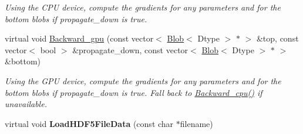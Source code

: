 \begin{DoxyCompactItemize}
\begin{DoxyCompactList}\small\item\em Using the C\+PU device, compute the gradients for any parameters and for the bottom blobs if propagate\+\_\+down is true. \end{DoxyCompactList}\item 
virtual void \hyperlink{classcaffe_1_1HDF5DataLayer_a052510a9ac8df9da59cefcacaecf07ce}{Backward\+\_\+gpu} (const vector$<$ \hyperlink{classcaffe_1_1Blob}{Blob}$<$ Dtype $>$ $\ast$ $>$ \&top, const vector$<$ bool $>$ \&propagate\+\_\+down, const vector$<$ \hyperlink{classcaffe_1_1Blob}{Blob}$<$ Dtype $>$ $\ast$ $>$ \&bottom)\hypertarget{classcaffe_1_1HDF5DataLayer_a052510a9ac8df9da59cefcacaecf07ce}{}\label{classcaffe_1_1HDF5DataLayer_a052510a9ac8df9da59cefcacaecf07ce}

\begin{DoxyCompactList}\small\item\em Using the G\+PU device, compute the gradients for any parameters and for the bottom blobs if propagate\+\_\+down is true. Fall back to \hyperlink{classcaffe_1_1HDF5DataLayer_a7239ed842b4e80c3bdf2b006eecde34a}{Backward\+\_\+cpu()} if unavailable. \end{DoxyCompactList}\item 
virtual void {\bfseries Load\+H\+D\+F5\+File\+Data} (const char $\ast$filename)\hypertarget{classcaffe_1_1HDF5DataLayer_a6fe59cc631f26f3323641ea480352119}{}\label{classcaffe_1_1HDF5DataLayer_a6fe59cc631f26f3323641ea480352119}

\end{DoxyCompactItemize}
